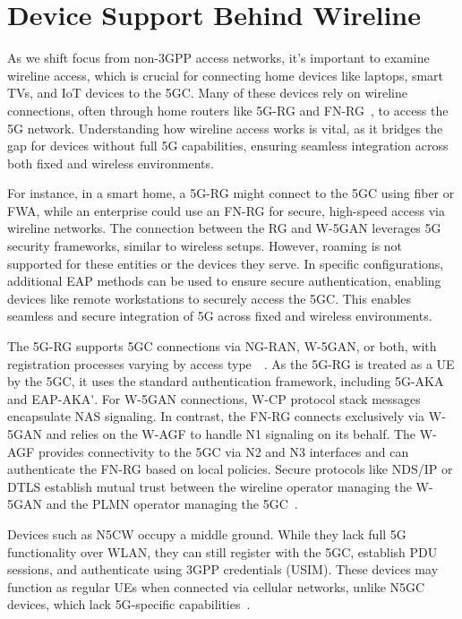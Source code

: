 \section{Device Support Behind Wireline}

As we shift focus from non-\ac{3GPP} access networks, it’s important to examine wireline access, which is crucial for connecting home devices like laptops, smart TVs, and \ac{IoT} devices to the \ac{5GC}. Many of these devices rely on wireline connections, often through home routers like \ac{5G-RG} and \ac{FN-RG}~\cite{33.501-p139}, to access the \ac{5G} network. Understanding how wireline access works is vital, as it bridges the gap for devices without full \ac{5G} capabilities, ensuring seamless integration across both fixed and wireless environments.

For instance, in a smart home, a \ac{5G-RG} might connect to the \ac{5GC} using fiber or \ac{FWA}, while an enterprise could use an \ac{FN-RG} for secure, high-speed access via wireline networks. The connection between the \ac{RG} and \ac{W-5GAN} leverages \ac{5G} security frameworks, similar to wireless setups. However, roaming is not supported for these entities or the devices they serve. In specific configurations, additional \ac{EAP} methods can be used to ensure secure authentication, enabling devices like remote workstations to securely access the \ac{5GC}. This enables seamless and secure integration of \ac{5G} across fixed and wireless environments.

The \ac{5G-RG} supports \ac{5GC} connections via \ac{NG-RAN}, \ac{W-5GAN}, or both, with registration processes varying by access type~\cite{23.316-p29}~\cite{23.316-p37}. As the \ac{5G-RG} is treated as a \ac{UE} by the \ac{5GC}, it uses the standard authentication framework, including \ac{5G-AKA} and \ac{EAP-AKA'}. For \ac{W-5GAN} connections, \ac{W-CP} protocol stack messages encapsulate \ac{NAS} signaling. In contrast, the \ac{FN-RG} connects exclusively via \ac{W-5GAN} and relies on the \ac{W-AGF} to handle N1 signaling on its behalf. The \ac{W-AGF} provides connectivity to the \ac{5GC} via N2 and N3 interfaces and can authenticate the \ac{FN-RG} based on local policies. Secure protocols like \ac{NDS/IP} or \ac{DTLS} establish mutual trust between the wireline operator managing the \ac{W-5GAN} and the \ac{PLMN} operator managing the \ac{5GC}~\cite{23.316-p41}.

Devices such as \ac{N5CW} occupy a middle ground. While they lack full \ac{5G} functionality over \ac{WLAN}, they can still register with the \ac{5GC}, establish \ac{PDU} sessions, and authenticate using \ac{3GPP} credentials (\ac{USIM}). These devices may function as regular \acp{UE} when connected via cellular networks, unlike \ac{N5GC} devices, which lack \ac{5G}-specific capabilities~\cite{33.501-p279}.

